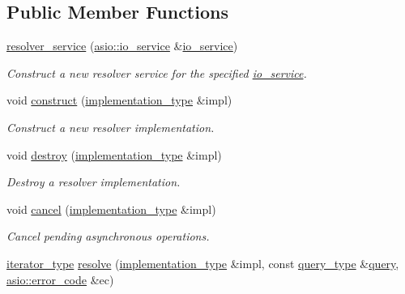 \subsection*{Public Member Functions}
\begin{DoxyCompactItemize}
\item 
\hyperlink{classasio_1_1ip_1_1resolver__service_a61456218a5d45785201a1384ee1874c9}{resolver\+\_\+service} (\hyperlink{classasio_1_1io__service}{asio\+::io\+\_\+service} \&\hyperlink{classasio_1_1io__service}{io\+\_\+service})
\begin{DoxyCompactList}\small\item\em Construct a new resolver service for the specified \hyperlink{classasio_1_1io__service}{io\+\_\+service}. \end{DoxyCompactList}\item 
void \hyperlink{classasio_1_1ip_1_1resolver__service_acb1057e716bdb48f7e35e8ab75bdeae0}{construct} (\hyperlink{classasio_1_1ip_1_1resolver__service_aa686664be9b5626ca662d4603ae3459b}{implementation\+\_\+type} \&impl)
\begin{DoxyCompactList}\small\item\em Construct a new resolver implementation. \end{DoxyCompactList}\item 
void \hyperlink{classasio_1_1ip_1_1resolver__service_a90296ea004dbf1aae155b540cb5e7478}{destroy} (\hyperlink{classasio_1_1ip_1_1resolver__service_aa686664be9b5626ca662d4603ae3459b}{implementation\+\_\+type} \&impl)
\begin{DoxyCompactList}\small\item\em Destroy a resolver implementation. \end{DoxyCompactList}\item 
void \hyperlink{classasio_1_1ip_1_1resolver__service_ad7b39f4e58e2a559c118a6cf35bcc5ce}{cancel} (\hyperlink{classasio_1_1ip_1_1resolver__service_aa686664be9b5626ca662d4603ae3459b}{implementation\+\_\+type} \&impl)
\begin{DoxyCompactList}\small\item\em Cancel pending asynchronous operations. \end{DoxyCompactList}\item 
\hyperlink{classasio_1_1ip_1_1resolver__service_a7b71bd80a7d9296ac334251bed0e2b4c}{iterator\+\_\+type} \hyperlink{classasio_1_1ip_1_1resolver__service_abfe2929f227383458f58754b7ad5a0ea}{resolve} (\hyperlink{classasio_1_1ip_1_1resolver__service_aa686664be9b5626ca662d4603ae3459b}{implementation\+\_\+type} \&impl, const \hyperlink{classasio_1_1ip_1_1resolver__service_a60008f0c960687605c978dff14011145}{query\+\_\+type} \&\hyperlink{classasio_1_1ip_1_1resolver__service_a150f786d8c12263e29e85662f4f8ed34}{query}, \hyperlink{classasio_1_1error__code}{asio\+::error\+\_\+code} \&ec)

\end{DoxyCompactItemize}
